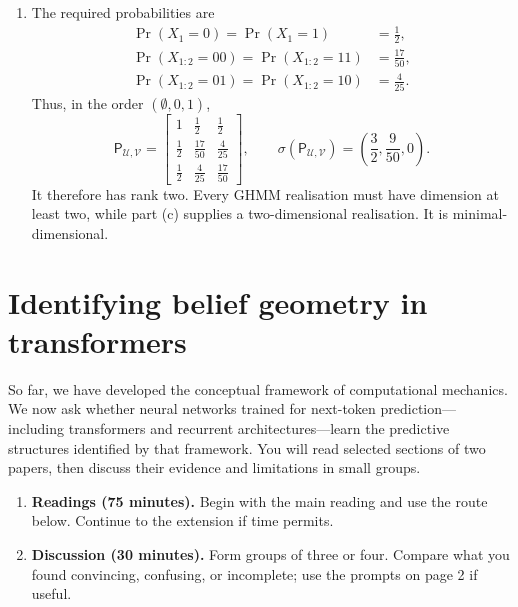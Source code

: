 \documentclass[11pt]{article}
\begin{document}
\begin{solution}[ex:p3-4]
\begin{enumerate}
\begin{enumerate}
          \item The required probabilities are
            \[
              \begin{aligned}
                \Pr(X_1=0)=\Pr(X_1=1)&=\frac12,\\
                \Pr(X_{1:2}=00)=\Pr(X_{1:2}=11)&=\frac{17}{50},\\
                \Pr(X_{1:2}=01)=\Pr(X_{1:2}=10)&=\frac4{25}.
              \end{aligned}
            \]
            Thus, in the order $(\emptyset,0,1)$,
            \[
              \mathsf P_{\mathcal U,\mathcal V}
                =
                \begin{bmatrix}
                  1&\tfrac12&\tfrac12\\
                  \tfrac12&\tfrac{17}{50}&\tfrac4{25}\\
                  \tfrac12&\tfrac4{25}&\tfrac{17}{50}
                \end{bmatrix},
              \qquad
              \sigma(\mathsf P_{\mathcal U,\mathcal V})
                =\left(\frac32,\frac9{50},0\right).
            \]
            It therefore has rank two. Every GHMM realisation must have
            dimension at least two, while part (c) supplies a
            two-dimensional realisation. It is minimal-dimensional.
        \end{enumerate}

    \end{enumerate}
\end{solution}


\section{Identifying belief geometry in transformers}\label{sec:belief-geometry}

So far, we have developed the conceptual framework of computational mechanics.
We now ask whether neural networks trained for next-token prediction---including
transformers and recurrent architectures---learn the predictive structures
identified by that framework. You will read selected sections of two papers,
then discuss their evidence and limitations in small groups.

\begin{callout}
  \begin{enumerate}
    \item \textbf{Readings (75 minutes).} Begin with the main reading and use
      the route below. Continue to the extension if time permits.
    \item \textbf{Discussion (30 minutes).} Form groups of three or four.
      Compare what you found convincing, confusing, or incomplete; use the
      prompts on page 2 if useful.
  \end{enumerate}
\end{callout}
\end{document}
